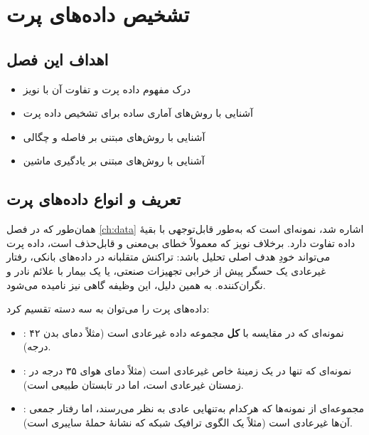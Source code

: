 \chapter{تشخیص داده‌های پرت}
\label{ch:outliers}

\section*{اهداف این فصل}
\begin{itemize}
    \item درک مفهوم داده پرت و تفاوت آن با نویز
    \item آشنایی با روش‌های آماری ساده برای تشخیص داده پرت
    \item آشنایی با روش‌های مبتنی بر فاصله و چگالی
    \item آشنایی با روش‌های مبتنی بر یادگیری ماشین
\end{itemize}

\section{تعریف و انواع داده‌های پرت}

همان‌طور که در فصل \ref{ch:data} اشاره شد،
 نمونه‌ای است که به‌طور قابل‌توجهی با
بقیهٔ داده تفاوت دارد. برخلاف نویز که معمولاً خطای بی‌معنی و قابل‌حذف
است، داده پرت می‌تواند خودِ هدف اصلی تحلیل باشد: تراکنش متقلبانه در
داده‌های بانکی، رفتار غیرعادی یک حسگر پیش از خرابی تجهیزات صنعتی، یا
یک بیمار با علائم نادر و نگران‌کننده. به همین دلیل، این وظیفه گاهی
 نیز نامیده می‌شود.

داده‌های پرت را می‌توان به سه دسته تقسیم کرد:

\begin{itemize}
    \item {}: نمونه‌ای که در
          مقایسه با \textbf{کل} مجموعه داده غیرعادی است (مثلاً دمای بدن
          ۴۲ درجه).
    \item {}: نمونه‌ای
          که تنها در یک زمینهٔ خاص غیرعادی است (مثلاً دمای هوای ۳۵ درجه
          در زمستان غیرعادی است، اما در تابستان طبیعی است).
    \item {}: مجموعه‌ای از
          نمونه‌ها که هرکدام به‌تنهایی عادی به نظر می‌رسند، اما رفتار
          جمعی آن‌ها غیرعادی است (مثلاً یک الگوی ترافیک شبکه که نشانهٔ
          حملهٔ سایبری است).
\end{itemize}

